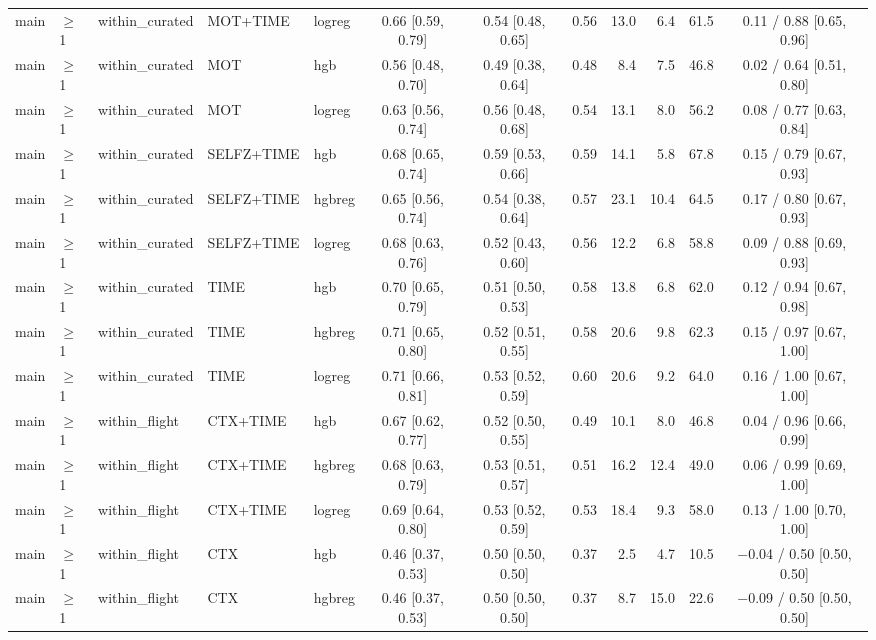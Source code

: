 \begin{longtable}{@{}lllllcccrrrc@{}}
main & $\geq$1 & within\_curated & MOT+TIME & logreg & 0.66 [0.59, 0.79] & 0.54 [0.48, 0.65] & 0.56 & 13.0 & 6.4 & 61.5 & 0.11 / 0.88 [0.65, 0.96] \\
main & $\geq$1 & within\_curated & MOT & hgb & 0.56 [0.48, 0.70] & 0.49 [0.38, 0.64] & 0.48 & 8.4 & 7.5 & 46.8 & 0.02 / 0.64 [0.51, 0.80] \\
main & $\geq$1 & within\_curated & MOT & logreg & 0.63 [0.56, 0.74] & 0.56 [0.48, 0.68] & 0.54 & 13.1 & 8.0 & 56.2 & 0.08 / 0.77 [0.63, 0.84] \\
main & $\geq$1 & within\_curated & SELFZ+TIME & hgb & 0.68 [0.65, 0.74] & 0.59 [0.53, 0.66] & 0.59 & 14.1 & 5.8 & 67.8 & 0.15 / 0.79 [0.67, 0.93] \\
main & $\geq$1 & within\_curated & SELFZ+TIME & hgbreg & 0.65 [0.56, 0.74] & 0.54 [0.38, 0.64] & 0.57 & 23.1 & 10.4 & 64.5 & 0.17 / 0.80 [0.67, 0.93] \\
main & $\geq$1 & within\_curated & SELFZ+TIME & logreg & 0.68 [0.63, 0.76] & 0.52 [0.43, 0.60] & 0.56 & 12.2 & 6.8 & 58.8 & 0.09 / 0.88 [0.69, 0.93] \\
main & $\geq$1 & within\_curated & TIME & hgb & 0.70 [0.65, 0.79] & 0.51 [0.50, 0.53] & 0.58 & 13.8 & 6.8 & 62.0 & 0.12 / 0.94 [0.67, 0.98] \\
main & $\geq$1 & within\_curated & TIME & hgbreg & 0.71 [0.65, 0.80] & 0.52 [0.51, 0.55] & 0.58 & 20.6 & 9.8 & 62.3 & 0.15 / 0.97 [0.67, 1.00] \\
main & $\geq$1 & within\_curated & TIME & logreg & 0.71 [0.66, 0.81] & 0.53 [0.52, 0.59] & 0.60 & 20.6 & 9.2 & 64.0 & 0.16 / 1.00 [0.67, 1.00] \\
main & $\geq$1 & within\_flight & CTX+TIME & hgb & 0.67 [0.62, 0.77] & 0.52 [0.50, 0.55] & 0.49 & 10.1 & 8.0 & 46.8 & 0.04 / 0.96 [0.66, 0.99] \\
main & $\geq$1 & within\_flight & CTX+TIME & hgbreg & 0.68 [0.63, 0.79] & 0.53 [0.51, 0.57] & 0.51 & 16.2 & 12.4 & 49.0 & 0.06 / 0.99 [0.69, 1.00] \\
main & $\geq$1 & within\_flight & CTX+TIME & logreg & 0.69 [0.64, 0.80] & 0.53 [0.52, 0.59] & 0.53 & 18.4 & 9.3 & 58.0 & 0.13 / 1.00 [0.70, 1.00] \\
main & $\geq$1 & within\_flight & CTX & hgb & 0.46 [0.37, 0.53] & 0.50 [0.50, 0.50] & 0.37 & 2.5 & 4.7 & 10.5 & $-$0.04 / 0.50 [0.50, 0.50] \\
main & $\geq$1 & within\_flight & CTX & hgbreg & 0.46 [0.37, 0.53] & 0.50 [0.50, 0.50] & 0.37 & 8.7 & 15.0 & 22.6 & $-$0.09 / 0.50 [0.50, 0.50] \\

\end{longtable}
